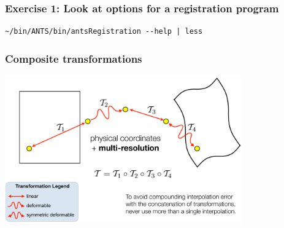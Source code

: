 

\begin{frame}[fragile]
\frametitle{Exercise 1: Look at options for a registration program}
\begin{verbatim}
~/bin/ANTS/bin/antsRegistration --help | less
\end{verbatim}
\end{frame}

\begin{frame}
\frametitle{Composite transformations}
\includegraphics[height=2.5in]{../Art/composite}
\end{frame}

